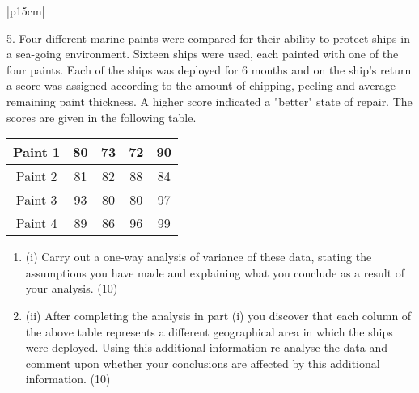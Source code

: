 \documentclass[a4paper,12pt]{article}
\begin{document}
\begin{table}[ht!]
     

\centering
     

\begin{tabular}{|p{15cm}|}
     

\hline 
\large

5. Four different marine paints were compared for their ability to protect ships in a sea-going environment.  Sixteen ships were used, each painted with one of the four paints.  Each of the ships was deployed for 6 months and on the ship's return a score was assigned according to the amount of chipping, peeling and average remaining paint thickness.  A higher score indicated a "better" state of repair.  The scores are given in the following table. 
 

\begin{center}
\begin{tabular}{|c||c|c|c|c|}
Paint 1 & 80 & 73 & 72&  90 \\ \hline 
Paint 2 & 81 & 82 & 88&  84  \\ \hline
Paint 3 & 93 & 80 & 80&  97 \\ \hline
Paint 4 & 89 & 86 & 96&  99 \\ \hline
\end{tabular}
\end{center}
 
\begin{enumerate} 
\item (i) Carry out a one-way analysis of variance of these data, stating the assumptions you have made and explaining what you conclude as a result of your analysis. (10) 
\item  
(ii) After completing the analysis in part (i) you discover that each column of the above table represents a different geographical area in which the ships were deployed.  Using this additional information re-analyse the data and comment upon whether your conclusions are affected by this additional information. (10) 
\end{enumerate} 
\\ \hline


\end{tabular}
    

\end{table}

\end{document}
